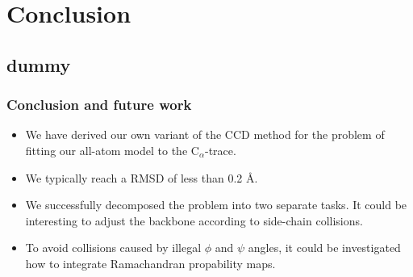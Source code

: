 \documentclass{beamer}
\begin{document}
\section{Conclusion}

\subsection{dummy}
\begin{frame}
	\frametitle{Conclusion and future work}
    \begin{itemize}
    \item We have derived our own variant of the CCD method for the
      problem of fitting our all-atom model to the C$_\alpha$-trace.
    \item We typically reach a RMSD of less than 0.2 Å.
    \item We successfully decomposed the problem into two separate
      tasks. It could be interesting to adjust the backbone according
      to side-chain collisions.
    \item To avoid collisions caused by illegal $\phi$ and $\psi$
      angles, it could be investigated
      how to integrate Ramachandran propability maps.
    \end{itemize}
\end{frame}
\end{document}
